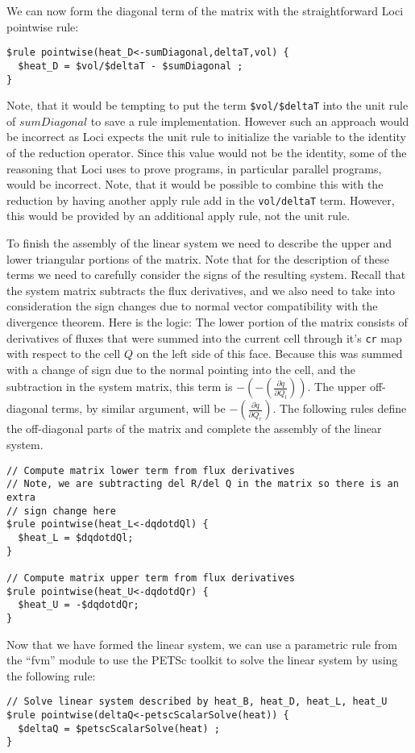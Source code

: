 \documentclass[10pt,epsf,letterpaper,twoside]{book}
\begin{document}
We can now form the diagonal term of the matrix with the
straightforward Loci pointwise rule:
\begin{verbatim}
$rule pointwise(heat_D<-sumDiagonal,deltaT,vol) {
  $heat_D = $vol/$deltaT - $sumDiagonal ; 
}
\end{verbatim}
Note, that it would be tempting to put the term {\tt \$vol/\$deltaT}
into the unit rule of $sumDiagonal$ to save a rule implementation.
However such an approach would be incorrect as Loci expects the unit
rule to initialize the variable to the identity of the reduction
operator.  Since this value would not be the identity, some of the
reasoning that Loci uses to prove programs, in particular parallel
programs, would be incorrect.  Note, that it would be possible to
combine this with the reduction by having another apply rule add in
the {\tt vol/deltaT} term. However, this would be provided by an
additional apply rule, not the unit rule.


To finish the assembly of the linear system we need to describe the
upper and lower triangular portions of the matrix.  Note that for the
description of these terms we need to carefully consider the signs of
the resulting system.  Recall that the system matrix subtracts the
flux derivatives, and we also need to take into consideration the sign
changes due to normal vector compatibility with the divergence
theorem.  Here is the logic:  The lower portion of the matrix consists
of derivatives of fluxes that were summed into the current cell
through it's {\tt cr} map with respect to the cell $Q$ on the left
side of this face.  Because this was summed with a change of sign due
to the normal pointing into the cell, and the subtraction in the system
matrix, this term is $- (- (\frac{\partial \dot{q}}{\partial Q_l}))$.
The upper off-diagonal terms, by similar argument, will be $-
(\frac{\partial \dot{q}}{\partial Q_r})$.  The following rules define
the off-diagonal parts of the matrix and complete the assembly of the
linear system.
\begin{verbatim}
// Compute matrix lower term from flux derivatives
// Note, we are subtracting del R/del Q in the matrix so there is an extra
// sign change here
$rule pointwise(heat_L<-dqdotdQl) {
  $heat_L = $dqdotdQl; 
}

// Compute matrix upper term from flux derivatives
$rule pointwise(heat_U<-dqdotdQr) {
  $heat_U = -$dqdotdQr;
}
\end{verbatim}

Now that we have formed the linear system, we can use a parametric
rule from the ``fvm'' module to use the PETSc toolkit to solve the
linear system by using the following rule:
\begin{verbatim}
// Solve linear system described by heat_B, heat_D, heat_L, heat_U
$rule pointwise(deltaQ<-petscScalarSolve(heat)) {
  $deltaQ = $petscScalarSolve(heat) ;
}
\end{verbatim}
\end{document}
